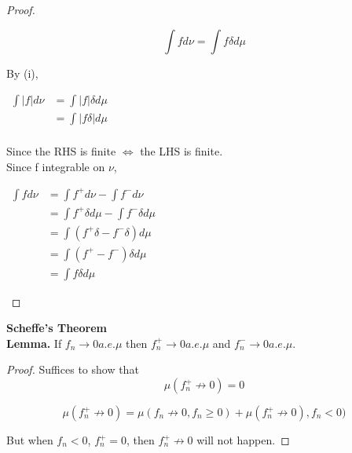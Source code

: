 \documentclass[11pt,fleqn]{book} %
\begin{document}
\begin{proof}
\begin{enumerate}
				$$\int f d\nu = \int f \delta d\mu $$

		By (i), 

				$\begin{aligned}
					\int |f| d\nu &= \int |f| \delta d\mu\\
						&=\int |f\delta| d\mu\\
				\end{aligned}$			

		Since the RHS is finite $\Leftrightarrow$ the LHS is finite. \\

		Since f integrable on $\nu$, 

			$\begin{aligned}
				\int f d\nu &= \int f^+ d\nu - \int f^- d\nu\\
					&=\int f^+ \delta d\mu - \int f^- \delta d\mu\\
					&= \int (f^+ \delta - f^- \delta) d\mu\\
					&= \int (f^+ - f^-)\delta d \mu\\
					&= \int f \delta d \mu
			\end{aligned}$
	\end{enumerate}
\end{proof}

\textbf{Scheffe's Theorem}\\

\textbf{Lemma.} If $f_n \rightarrow 0 a.e. \mu$ then $f_n^+ \rightarrow 0 a.e. \mu$ and $f_n^- \rightarrow 0 a.e. \mu$. 

\begin{proof}
	Suffices to show that 
			$$\mu(f_n^+ \not\rightarrow 0) = 0 $$

			$$\mu(f_n^+ \not\rightarrow 0) = \mu(f_n \not \rightarrow 0, f_n \geq 0) + \mu(f_n^+ \not \rightarrow 0), f_n < 0)$$

	But when $f_n < 0$, $f_n^+ = 0$, then $f_n^+ \not\rightarrow 0 $ will not happen.

\end{proof}
\end{document}
